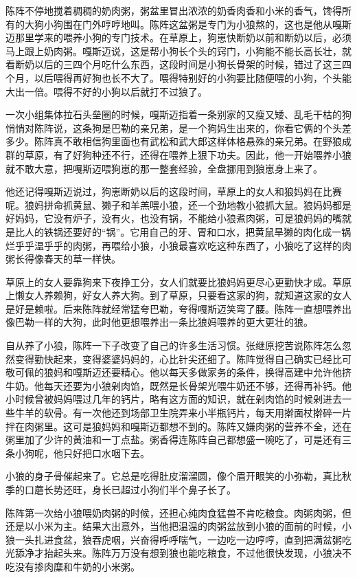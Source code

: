 \par 陈阵不停地搅着稠稠的奶肉粥，粥盆里冒出浓浓的奶香肉香和小米的香气，馋得所有的大狗小狗围在门外哼哼地叫。陈阵这盆粥是专门为小狼熬的，这也是他从嘎斯迈那里学来的喂养小狗的专门技术。在草原上，狗崽快断奶以前和断奶以后，必须马上跟上奶肉粥。嘎斯迈说，这是帮小狗长个头的窍门，小狗能不能长高长壮，就看断奶以后的三四个月吃什么东西，这段时间是小狗长骨架的时候，错过了这三四个月，以后喂得再好狗也长不大了。喂得特别好的小狗要比随便喂的小狗，个头能大出一倍。喂得不好的小狗以后就打不过狼了。
\par 一次小组集体拉石头垒圈的时候，嘎斯迈指着一条别家的又瘦又矮、乱毛干枯的狗悄悄对陈阵说，这条狗是巴勒的亲兄弟，是一个狗妈生出来的，你看它俩的个头差多少。陈阵真不敢相信狗里面也有武松和武大郎这样体格悬殊的亲兄弟。在野狼成群的草原，有了好狗种还不行，还得在喂养上狠下功夫。因此，他一开始喂养小狼就不敢大意，把嘎斯迈喂狗崽的那一整套经验，全盘挪用到狼崽身上来了。
\par 他还记得嘎斯迈说过，狗崽断奶以后的这段时间，草原上的女人和狼妈妈在比赛呢。狼妈拼命抓黄鼠、獭子和羊羔喂小狼，还一个劲地教小狼抓大鼠。狼妈妈都是好妈妈，它没有炉子，没有火，也没有锅，不能给小狼煮肉粥，可是狼妈妈的嘴就是比人的铁锅还要好的“锅”。它用自己的牙、胃和口水，把黄鼠旱獭的肉化成一锅烂乎乎温乎乎的肉粥，再喂给小狼，小狼最喜欢吃这种东西了，小狼吃了这样的肉粥长得像春天的草一样快。
\par 草原上的女人要靠狗来下夜挣工分，女人们就要比狼妈妈更尽心更勤快才成。草原上懒女人养赖狗，好女人养大狗。到了草原，只要看这家的狗，就知道这家的女人是好是赖啦。后来陈阵就经常猛夸巴勒，夸得嘎斯迈笑弯了腰。陈阵一直想喂养出像巴勒一样的大狗，此时他更想喂养出一条比狼妈喂养的更大更壮的狼。
\par 自从养了小狼，陈阵一下子改变了自己的许多生活习惯。张继原挖苦说陈阵怎么忽然变得勤快起来，变得婆婆妈妈的，心比针尖还细了。陈阵觉得自己确实已经比可敬可佩的狼妈和嘎斯迈还要精心。他以每天多做家务的条件，换得高建中允许他挤牛奶。他每天还要为小狼剁肉馅，既然是长骨架光喂牛奶还不够，还得再补钙。他小时候曾被妈妈喂过几年的钙片，略有这方面的知识，就在剁肉馅的时候剁进去一些牛羊的软骨。有一次他还到场部卫生院弄来小半瓶钙片，每天用擀面杖擀碎一片拌在肉粥里。这可是狼妈妈和嘎斯迈都想不到的。陈阵又嫌肉粥的营养不全，还在粥里加了少许的黄油和一丁点盐。粥香得连陈阵自己都想盛一碗吃了，可是还有三条小狗呢，他只好把口水咽下去。
\par 小狼的身子骨催起来了。它总是吃得肚皮溜溜圆，像个眉开眼笑的小弥勒，真比秋季的口蘑长势还旺，身长已超过小狗们半个鼻子长了。
\par 陈阵第一次给小狼喂奶肉粥的时候，还担心纯肉食猛兽不肯吃粮食。肉粥肉粥，但还是以小米为主。结果大出意外，当他把温温的肉粥盆放到小狼的面前的时候，小狼一头扎进食盆，狼吞虎咽，兴奋得呼呼喘气，一边吃一边哼哼，直到把满盆粥吃光舔净才抬起头来。陈阵万万没有想到狼也能吃粮食，不过他很快发现，小狼决不吃没有掺肉糜和牛奶的小米粥。
